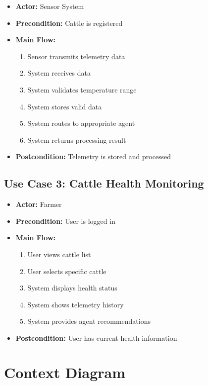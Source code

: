 \begin{itemize}
    \item \textbf{Actor:} Sensor System
    \item \textbf{Precondition:} Cattle is registered
    \item \textbf{Main Flow:}
    \begin{enumerate}
        \item Sensor transmits telemetry data
        \item System receives data
        \item System validates temperature range
        \item System stores valid data
        \item System routes to appropriate agent
        \item System returns processing result
    \end{enumerate}
    \item \textbf{Postcondition:} Telemetry is stored and processed
\end{itemize}

\subsection{Use Case 3: Cattle Health Monitoring}

\begin{itemize}
    \item \textbf{Actor:} Farmer
    \item \textbf{Precondition:} User is logged in
    \item \textbf{Main Flow:}
    \begin{enumerate}
        \item User views cattle list
        \item User selects specific cattle
        \item System displays health status
        \item System shows telemetry history
        \item System provides agent recommendations
    \end{enumerate}
    \item \textbf{Postcondition:} User has current health information
\end{itemize}

\section{Context Diagram}

